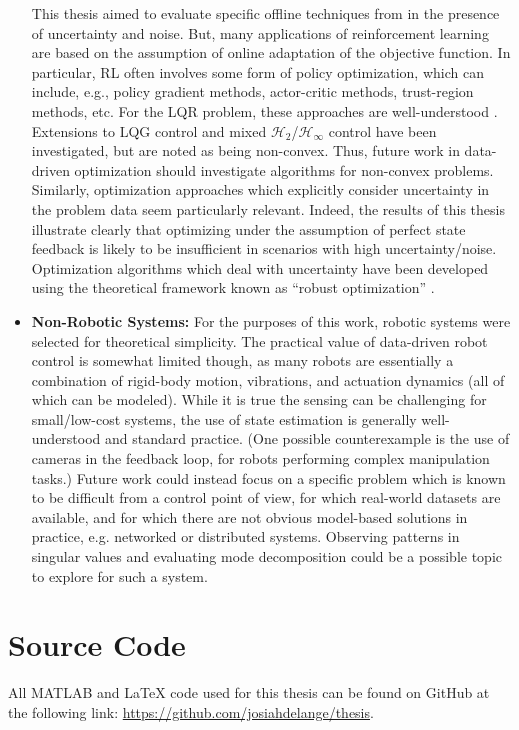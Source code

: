 \begin{itemize}
{This thesis aimed to evaluate specific offline techniques from \cite{de2019formulas} in the presence of uncertainty and noise.  But, many applications of reinforcement learning are based on the assumption of online adaptation of the objective function.  In particular, RL often involves some form of policy optimization, which can include, e.g., policy gradient methods, actor-critic methods, trust-region methods, etc.  For the LQR problem, these approaches are well-understood \cite{malik2019derivative}.  Extensions to LQG control \cite{zheng2022escaping, umenberger2022globally} and mixed $\mathcal{H}_{2}$/$\mathcal{H}_{\infty}$ control \cite{zhang2021derivative, zhang2020policy} have been investigated, but are noted as being non-convex.  Thus, future work in data-driven optimization should investigate algorithms for non-convex problems.  Similarly, optimization approaches which explicitly consider uncertainty in the problem data seem particularly relevant.  Indeed, the results of this thesis illustrate clearly that optimizing under the assumption of perfect state feedback is likely to be insufficient in scenarios with high uncertainty/noise.  Optimization algorithms which deal with uncertainty have been developed using the theoretical framework known as ``robust optimization'' \cite{soyster1973convex, ei1997robust, el1998robust, ben1999robust, ben2001lectures, ben2002robust, bertsimas2003robust, bertsimas2004price, chaerani2006modeling, joelianto5417249}.
}
%
\item{\textbf{Non-Robotic Systems:}
For the purposes of this work, robotic systems were selected for theoretical simplicity.  The practical value of data-driven robot control is somewhat limited though, as many robots are essentially a combination of rigid-body motion, vibrations, and actuation dynamics (all of which can be modeled).  While it is true the sensing can be challenging for small/low-cost systems, the use of state estimation is generally well-understood and standard practice.  (One possible counterexample is the use of cameras in the feedback loop, for robots performing complex manipulation tasks.)  Future work could instead focus on a specific problem which is known to be difficult from a control point of view, for which real-world datasets are available, and for which there are not obvious model-based solutions in practice, e.g. networked or distributed systems.  Observing patterns in singular values and evaluating mode decomposition could be a possible topic to explore for such a system.
}
\end{itemize}

\section{Source Code}
All MATLAB and LaTeX code used for this thesis can be found on GitHub at the following link: \url{https://github.com/josiahdelange/thesis}.
